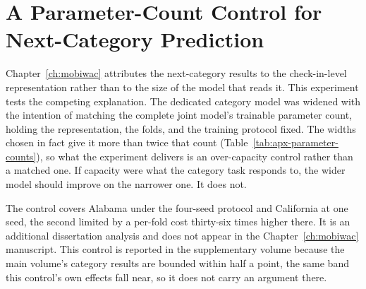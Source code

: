 %
\chapter{A Parameter-Count Control for Next-Category Prediction}
\label{apx:parameter-count-control}

Chapter~\ref{ch:mobiwac} attributes the next-category results to the check-in-level
representation rather than to the size of the model that reads it. This experiment tests the
competing explanation. The dedicated category model was widened with the intention of matching the
complete joint model's trainable parameter count, holding the representation, the folds, and the
training protocol fixed. The widths chosen in fact give it more than twice that count
(Table~\ref{tab:apx-parameter-counts}), so what the experiment delivers is an over-capacity control
rather than a matched one. If capacity were what the category task responds to, the wider model
should improve on the narrower one. It does not.

The control covers Alabama under the four-seed protocol and California at one seed, the second
limited by a per-fold cost thirty-six times higher there. It is an additional dissertation analysis
and does not appear in the Chapter~\ref{ch:mobiwac} manuscript.
This control is reported in the supplementary volume because the main volume's category results are
bounded within half a point, the same band this control's own effects fall near, so it does not
carry an argument there.

